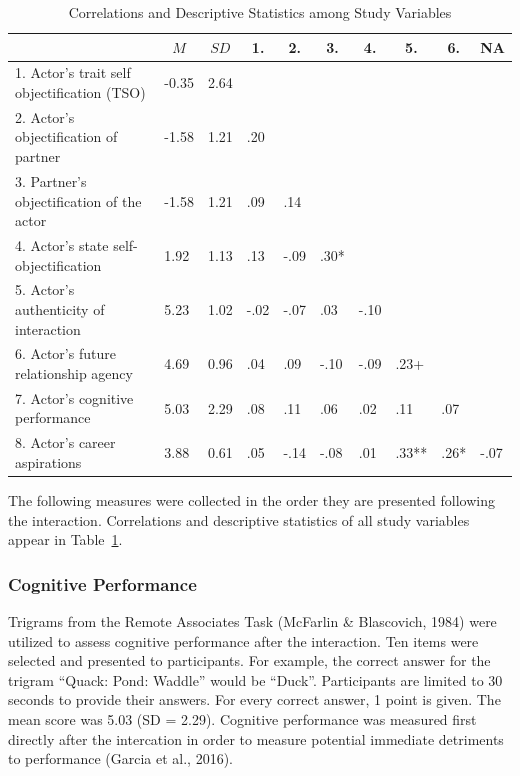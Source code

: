 \documentclass[man]{apa6}
\begin{document}
\begin{table}[tbp]
\begin{center}
\begin{threeparttable}
\caption{\label{tab:corrtable}Correlations and Descriptive Statistics among Study Variables}
\begin{tabular}{llllllllll}
\toprule
 & \multicolumn{1}{c}{$M$} & \multicolumn{1}{c}{$SD$} & \multicolumn{1}{c}{1.} & \multicolumn{1}{c}{2.} & \multicolumn{1}{c}{3.} & \multicolumn{1}{c}{4.} & \multicolumn{1}{c}{5.} & \multicolumn{1}{c}{6.} & \multicolumn{1}{c}{NA}\\
\midrule
1. Actor's trait self objectification (TSO) & -0.35 & 2.64 &  &  &  &  &  &  & \\
2. Actor's objectification of partner & -1.58 & 1.21 & .20 &  &  &  &  &  & \\
3. Partner's objectification of the actor & -1.58 & 1.21 & .09 & .14 &  &  &  &  & \\
4. Actor's state self-objectification & 1.92 & 1.13 & .13 & -.09 & .30* &  &  &  & \\
5. Actor's authenticity of interaction & 5.23 & 1.02 & -.02 & -.07 & .03 & -.10 &  &  & \\
6. Actor's future relationship agency & 4.69 & 0.96 & .04 & .09 & -.10 & -.09 & .23+ &  & \\
7. Actor's cognitive performance & 5.03 & 2.29 & .08 & .11 & .06 & .02 & .11 & .07 & \\
8. Actor's career aspirations & 3.88 & 0.61 & .05 & -.14 & -.08 & .01 & .33** & .26* & -.07\\
\bottomrule
\end{tabular}
\end{threeparttable}
\end{center}
\end{table}

The following measures were collected in the order they are presented
following the interaction. Correlations and descriptive statistics of
all study variables appear in Table~\ref{tab:corrtable}.

\subsubsection{Cognitive Performance}\label{cognitive-performance}

Trigrams from the Remote Associates Task (McFarlin \& Blascovich, 1984)
were utilized to assess cognitive performance after the interaction. Ten
items were selected and presented to participants. For example, the
correct answer for the trigram \enquote{Quack: Pond: Waddle} would be
\enquote{Duck}. Participants are limited to 30 seconds to provide their
answers. For every correct answer, 1 point is given. The mean score was
5.03 (SD = 2.29). Cognitive performance was measured first directly
after the intercation in order to measure potential immediate detriments
to performance (Garcia et al., 2016).
\end{document}
